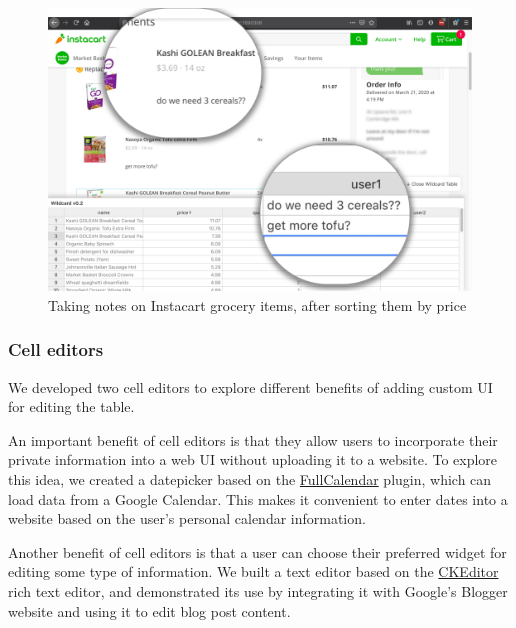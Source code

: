 \documentclass[sigplan,screen,10pt,anonymous,review]{acmart}
\begin{document}
\begin{figure}
\hypertarget{fig:instacart}{%
\centering
\includegraphics[width=\columnwidth]{media/instacart.png}
\caption{Taking notes on Instacart grocery items, after sorting them by price}\label{fig:instacart}
}
\end{figure}

\hypertarget{cell-editors}{%
\subsubsection{Cell editors}\label{cell-editors}}

We developed two cell editors to explore different benefits of adding
custom UI for editing the table.

An important benefit of cell editors is that they allow users to
incorporate their private information into a web UI without uploading it
to a website. To explore this idea, we created a datepicker based on the
\href{https://fullcalendar.io/}{FullCalendar} plugin, which can load
data from a Google Calendar. This makes it convenient to enter dates
into a website based on the user's personal calendar information.

Another benefit of cell editors is that a user can choose their
preferred widget for editing some type of information. We built a text
editor based on the \href{https://ckeditor.com/}{CKEditor} rich text
editor, and demonstrated its use by integrating it with Google's Blogger
website and using it to edit blog post content.
\end{document}
